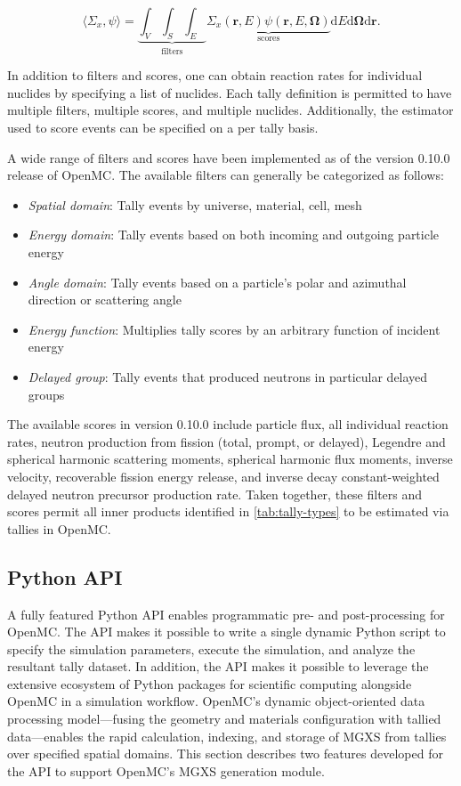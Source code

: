 \begin{equation}
\langle \Sigma_x, \psi \rangle = \underbrace{\int_{V} \int_{S} \int_{E}}_{\text{filters}} \underbrace{\Sigma_{x}(\mathbf{r},E)\psi(\mathbf{r},E,\mathbf{\Omega})}_{\text{scores}} \mathrm{d}E\mathrm{d}\mathbf{\Omega}\mathrm{d}\mathbf{r}.
\end{equation}

In addition to filters and scores, one can obtain reaction rates for individual nuclides by specifying a list of nuclides. Each tally definition is permitted to have multiple filters, multiple scores, and multiple nuclides. Additionally, the estimator used to score events can be specified on a per tally basis.

A wide range of filters and scores have been implemented as of the version 0.10.0 release of OpenMC\cite{openmc-090}. The available filters can generally be categorized as follows:
\begin{itemize}[noitemsep]
\item \emph{Spatial domain}: Tally events by universe, material, cell, mesh
\item \emph{Energy domain}: Tally events based on both incoming and outgoing particle energy
\item \emph{Angle domain}: Tally events based on a particle's polar and azimuthal direction or scattering angle
\item \emph{Energy function}: Multiplies tally scores by an arbitrary function of incident energy
\item \emph{Delayed group}: Tally events that produced neutrons in particular delayed groups
\end{itemize}
The available scores in version 0.10.0 include particle flux, all individual reaction rates, neutron production from fission (total, prompt, or delayed), Legendre and spherical harmonic scattering moments, spherical harmonic flux moments, inverse velocity, recoverable fission energy release, and inverse decay constant-weighted delayed neutron precursor production rate. Taken together, these filters and scores permit all inner products identified in \cref{tab:tally-types} to be estimated via tallies in OpenMC.

\subsection{Python API}
\label{subsec:pyapi}

A fully featured Python API enables programmatic pre- and post-processing for OpenMC\cite{boyd2016bigdata}. The API makes it possible to write a single dynamic Python script to specify the simulation parameters, execute the simulation, and analyze the resultant tally dataset. In addition, the API makes it possible to leverage the extensive ecosystem of Python packages for scientific computing alongside OpenMC in a simulation workflow. OpenMC's dynamic object-oriented data processing model---fusing the geometry and materials configuration with tallied data---enables the rapid calculation, indexing, and storage of MGXS from tallies over specified spatial domains. This section describes two features developed for the API to support OpenMC's MGXS generation module.


